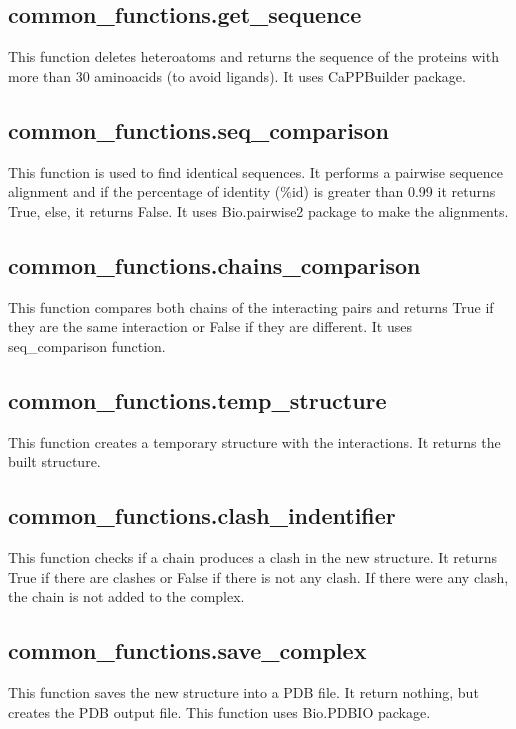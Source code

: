 \documentclass[a4paper,10pt]{report}
\begin{document}
\subsection{common\_functions.get\_sequence}

This function deletes heteroatoms and returns the sequence of the proteins with more than 30 aminoacids (to avoid ligands). It uses CaPPBuilder package.

\subsection{common\_functions.seq\_comparison}

This function is used to find identical sequences. It performs a pairwise sequence alignment and if the percentage of identity (\%id) is greater than 0.99 it returns True, else, it returns False. It uses Bio.pairwise2 package to make the alignments.

\subsection{common\_functions.chains\_comparison}

This function compares both chains of the interacting pairs and returns True if they are the same interaction or False if they are different. It uses seq\_comparison function.

\subsection{common\_functions.temp\_structure}

This function creates a temporary structure with the interactions. It returns the built structure.

\subsection{common\_functions.clash\_indentifier}

This function checks if a chain produces a clash in the new structure. It returns True if there are clashes or False if there is not any clash. If there were any clash, the chain is not added to the complex.

\subsection{common\_functions.save\_complex}

This function saves the new structure into a PDB file. It return nothing, but creates the PDB output file. This function uses Bio.PDBIO package.
\end{document}
